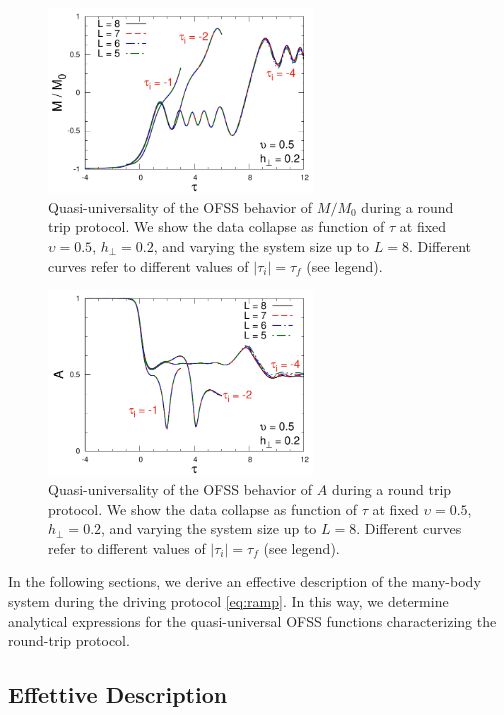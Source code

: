 \begin{figure}[t]
\centering
\includegraphics[width=7cm]{imm/Mt2u500g2diffti.pdf}
\caption{Quasi-universality of the OFSS behavior of $M/M_0$ during a round trip protocol. We show the data collapse as function of $\tau$ at fixed $\upsilon=0.5$, $h_\perp=0.2$, and varying the system size up to $L=8$. Different curves refer to different values of $|\tau_i|=\tau_f$ (see legend).}\label{fig:dependence-ti-M}
\end{figure}
\begin{figure}[t]
\centering
\includegraphics[width=7cm]{imm/At2u500g2diffti.pdf}
\caption{Quasi-universality of the OFSS behavior of $A$ during a round trip protocol. We show the data collapse as function of $\tau$ at fixed $\upsilon=0.5$, $h_\perp=0.2$, and varying the system size up to $L=8$. Different curves refer to different values of $|\tau_i|=\tau_f$ (see legend).}\label{fig:dependence-ti-A}
\end{figure}
In the following sections, we derive an effective description of the many-body system during the driving protocol \eqref{eq:ramp}. In this way, we determine analytical expressions for the quasi-universal OFSS functions characterizing the round-trip protocol.







\subsection{Effettive Description}
\label{sec:effective-description}

